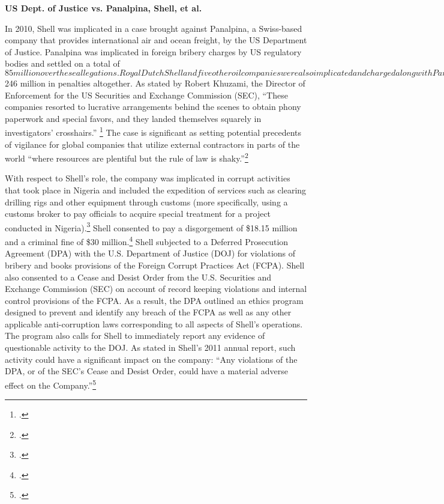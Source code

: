 \textbf{US Dept. of Justice vs. Panalpina, Shell, et al.}



In 2010, Shell was implicated in a case brought against Panalpina, a Swiss-based company that provides international air and ocean freight, by the US Department of Justice. Panalpina was implicated in foreign bribery charges by US regulatory bodies and settled on a total of $85 million over these allegations. Royal Dutch Shell and five other oil companies were also implicated and charged along with Panalpina, paying a total of $246 million in penalties altogether. As stated by Robert Khuzami, the Director of Enforcement for the US Securities and Exchange Commission (SEC), “These companies resorted to lucrative arrangements behind the scenes to obtain phony paperwork and special favors, and they landed themselves squarely in investigators’ crosshairs.” \footcite[][p. 119]{KochanGoodYear_2011} The case is significant as setting potential precedents of vigilance for global companies that utilize external contractors in parts of the world ``where resources are plentiful but the rule of law is shaky.''\footcite[][]{Bribery_2010}



With respect to Shell’s role, the company was implicated in corrupt activities that took place in Nigeria and included the expedition of services such as clearing drilling rigs and other equipment through customs (more specifically, using a customs broker to pay officials to acquire special treatment for a project conducted in Nigeria).\footcite[][]{ShellBribes_2010}
Shell consented to pay a disgorgement of \$18.15 million and a criminal fine of \$30 million.\footcite[][]{SullivanCromwell_2010}
Shell subjected to a Deferred Prosecution Agreement (DPA) with the U.S. Department of Justice (DOJ) for violations of bribery and books provisions of the Foreign Corrupt Practices Act (FCPA). 
Shell also consented to a Cease and Desist Order from the U.S. Securities and Exchange Commission (SEC) on account of record keeping violations and internal control provisions of the FCPA. 
As a result, the DPA outlined an ethics program designed to prevent and identify any breach of the FCPA as well as any other applicable anti-corruption laws corresponding to all aspects of Shell’s operations. 
The program also calls for Shell to immediately report any evidence of questionable activity to the DOJ. 
As stated in Shell's 2011 annual report, such activity could have a significant impact on the company: ``Any violations of the DPA, or of the SEC’s Cease and Desist Order, could have a material adverse effect on the Company.''\footcite[][]{Shell_2011}



